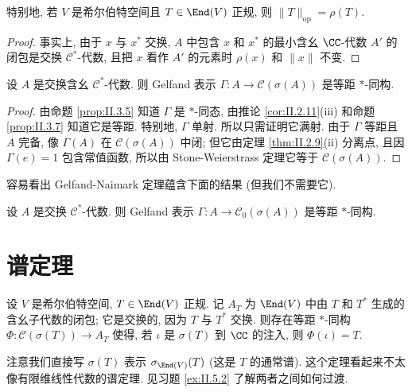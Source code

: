 特别地, 若 $V$ 是希尔伯特空间且 $T \in \End(V)$ 正规, 则 $\|T\|_{\mathrm{op}} = \rho(T)$.

\begin{proof}
事实上, 由于 $x$ 与 $x^*$ 交换, $A$ 中包含 $x$ 和 $x^*$ 的最小含幺 $\CC$-代数 $A'$ 的闭包是交换 $\mathcal{C}^*$-代数, 且把 $x$ 看作 $A'$ 的元素时 $\rho(x)$ 和 $\|x\|$ 不变.
\end{proof}

\begin{theorem}
\label{thm:II.3.10}
设 $A$ 是交换含幺 $\mathcal{C}^*$-代数. 则 Gelfand 表示 $\Gamma \colon A \to \mathcal{C}(\sigma(A))$ 是等距 $*$-同构.
\end{theorem}

\begin{proof}
由命题 \ref{prop:II.3.5} 知道 $\Gamma$ 是 $*$-同态, 由推论 \ref{cor:II.2.11}(iii) 和命题 \ref{prop:II.3.7} 知道它是等距. 特别地, $\Gamma$ 单射. 所以只需证明它满射. 由于 $\Gamma$ 等距且 $A$ 完备, 像 $\Gamma(A)$ 在 $\mathcal{C}(\sigma(A))$ 中闭; 但它由定理 \ref{thm:II.2.9}(ii) 分离点, 且因 $\Gamma(e) = 1$ 包含常值函数, 所以由 Stone-Weierstrass 定理它等于 $\mathcal{C}(\sigma(A))$.
\end{proof}

容易看出 Gelfand-Naimark 定理蕴含下面的结果 (但我们不需要它).

\begin{corollary}
\label{cor:II.3.11}
设 $A$ 是交换 $\mathcal{C}^*$-代数. 则 Gelfand 表示 $\Gamma \colon A \to \mathcal{C}_0(\sigma(A))$ 是等距 $*$-同构.
\end{corollary}

\section{谱定理}

\begin{theorem}[谱定理]
\label{thm:II.4.1}
设 $V$ 是希尔伯特空间, $T \in \End(V)$ 正规. 记 $A_T$ 为 $\End(V)$ 中由 $T$ 和 $T^*$ 生成的含幺子代数的闭包; 它是交换的, 因为 $T$ 与 $T^*$ 交换.
则存在等距 $*$-同构 $\Phi \colon \mathcal{C}(\sigma(T)) \to A_T$ 使得, 若 $\iota$ 是 $\sigma(T)$ 到 $\CC$ 的注入, 则 $\Phi(\iota) = T$.
\end{theorem}

注意我们直接写 $\sigma(T)$ 表示 $\sigma_{\End(V)}(T)$ (这是 $T$ 的通常谱).
这个定理看起来不太像有限维线性代数的谱定理. 见习题 \ref{ex:II.5.2} 了解两者之间如何过渡.

